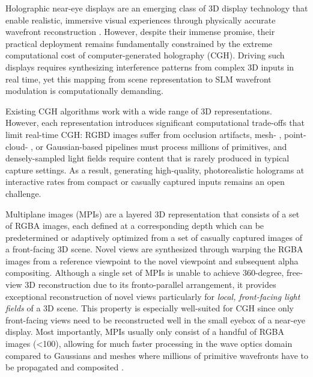 Holographic near-eye displays are an emerging class of 3D display technology that enable realistic, immersive visual experiences through physically accurate wavefront reconstruction \cite{maimone2017holographic, chao2024large, gopakumar2024full, kim:HolographicGlasses, jang2024waveguide}. However, despite their immense promise, their practical deployment remains fundamentally constrained by the extreme computational cost of computer-generated holography (CGH). Driving such displays requires synthesizing interference patterns from complex 3D inputs in real time, yet this mapping from scene representation to SLM wavefront modulation is computationally demanding.

Existing CGH algorithms work with a wide range of 3D representations. However, each representation introduces significant computational trade-offs that limit real-time CGH:
RGBD images \cite{choi2021neural, peng2020neural} suffer from occlusion artifacts, mesh- \cite{matsushima2005computer, matsushima2009extremely}, point-cloud- \cite{h2009computer, maimone2017holographic}, or Gaussian-based \cite{choi2025gaussian, chao2025rpws} pipelines must process millions of primitives, and densely-sampled light fields \cite{chao2024large, schiffers2023stochastic} require content that is rarely produced in typical capture settings. As a result, generating high-quality, photorealistic holograms at interactive rates from compact or casually captured inputs remains an open challenge. 

Multiplane images (MPIs) \cite{zhou2018mpi, pu2023sinmpi, khan2023tiledmpi, han2022adaptivempi, tucker2020singlempi, flynn2019deepviewmpi, zhao2022generativempi, luvizon2021adaptivempi, srinivasan2019pushingmpi} are a layered 3D representation that consists of a set of RGBA images, each defined at a corresponding depth which can be predetermined or adaptively optimized from a set of casually captured images of a front-facing 3D scene. Novel views are synthesized through warping the RGBA images from a reference viewpoint to the novel viewpoint and subsequent alpha compositing. Although a single set of MPIs is unable to achieve 360-degree, free-view 3D reconstruction due to its fronto-parallel arrangement, it provides exceptional reconstruction of novel views particularly for \textit{local, front-facing light fields} of a 3D scene. This property is especially well-suited for CGH since only front-facing views need to be reconstructed well in the small eyebox of a near-eye display. Most importantly, MPIs usually only consist of a handful of RGBA images (<100), allowing for much faster processing in the wave optics domain compared to Gaussians and meshes where millions of primitive wavefronts have to be propagated and composited \cite{choi2025gaussian, matsushima2009extremely, matsushima2018full}.

